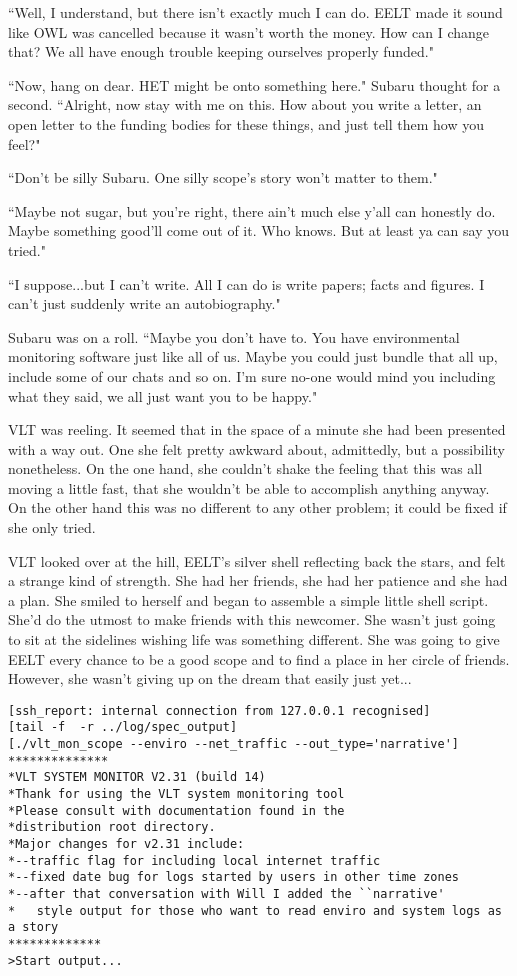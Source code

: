 \documentclass[12pt]{iopart}
\begin{document}
``Well, I understand, but there isn't exactly much I can do. EELT made it sound like OWL was cancelled because it wasn't worth the money. How can I change that? We all have enough trouble keeping ourselves properly funded."

``Now, hang on dear. HET might be onto something here." Subaru thought for a second. ``Alright, now stay with me on this. How about you write a letter, an open letter to the funding bodies for these things, and just tell them how you feel?"

``Don't be silly Subaru. One silly scope's story won't matter to them."

``Maybe not sugar, but you're right, there ain't much else y'all can honestly do. Maybe something good'll come out of it. Who knows. But at least ya can say you tried."

``I suppose...but I can't write. All I can do is write papers; facts and figures. I can't just suddenly write an autobiography."

Subaru was on a roll. ``Maybe you don't have to. You have environmental monitoring software just like all of us. Maybe you could just bundle that all up, include some of our chats and so on. I'm sure no-one would mind you including what they said, we all just want you to be happy."

VLT was reeling. It seemed that in the space of a minute she had been presented with a way out. One she felt pretty awkward about, admittedly, but a possibility nonetheless. On the one hand, she couldn't shake the feeling that this was all moving a little fast, that she wouldn't be able to accomplish anything anyway. On the other hand this was no different to any other problem; it could be fixed if she only tried.

VLT looked over at the hill, EELT's silver shell reflecting back the stars, and felt a strange kind of strength. She had her friends, she had her patience and she had a plan. She smiled to herself and began to assemble a simple little shell script. She'd do the utmost to make friends with this newcomer. She wasn't just going to sit at the sidelines wishing life was something different. She was going to give EELT every chance to be a good scope and to find a place in her circle of friends. However, she wasn't giving up on the dream that easily just yet...

\begin{verbatim}
[ssh_report: internal connection from 127.0.0.1 recognised]
[tail -f  -r ../log/spec_output]
[./vlt_mon_scope --enviro --net_traffic --out_type='narrative']
**************
*VLT SYSTEM MONITOR V2.31 (build 14)
*Thank for using the VLT system monitoring tool
*Please consult with documentation found in the
*distribution root directory.
*Major changes for v2.31 include:
*--traffic flag for including local internet traffic
*--fixed date bug for logs started by users in other time zones
*--after that conversation with Will I added the ``narrative'
*   style output for those who want to read enviro and system logs as a story
*************
>Start output...
\end{verbatim}
\end{document}

